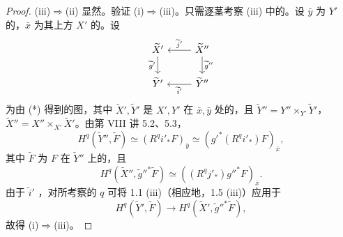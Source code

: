 \begin{proof}
(iii)$\Rightarrow$(ii) 显然。验证 (i)$\Rightarrow$(iii)。只需逐茎考察 (iii) 中的。设 $\bar y$ 为 $Y'$ 的，$\bar x$ 为其上方 $X'$ 的。设
\[
\begin{tikzcd}
\widetilde X'\arrow[d,"\widetilde g'"']&\widetilde X''\arrow[l,"\widetilde j'"']\arrow[d,"\widetilde g''"]\\
\widetilde Y'&\widetilde Y''\arrow[l,"\widetilde i'"]
\end{tikzcd}
\]
为由 (*) 得到的图，其中 $\widetilde X',\widetilde Y'$ 是 $X',Y'$ 在 $\bar x,\bar y$ 处的，且 $\widetilde Y''=Y''\times_{Y'}\widetilde Y'$，$\widetilde X''=X''\times_{X'}\widetilde X'$。由第 VIII 讲 5.2、5.3，
\[H^q(\widetilde Y'',\widetilde F)\simeq(R^qi'_*F)_{\bar y}\simeq(g'^*(R^qi'_*)F)_{\bar x},\]
其中 $\widetilde F$ 为 $F$ 在 $\widetilde Y''$ 上的，且
\[H^q(\widetilde X'',\widetilde g''^*\widetilde F)\simeq((R^qj'_*)g''^*F)_{\bar x}.\]
由于 $\widetilde i'$ ，对所考察的 $q$ 可将 1.1 (iii)（相应地，1.5 (iii)）应用于
\[H^q(\widetilde Y',\widetilde F)\longrightarrow H^q(\widetilde X',\widetilde g''^*\widetilde F),\]
故得 (i)$\Rightarrow$(iii)。


\end{proof}
